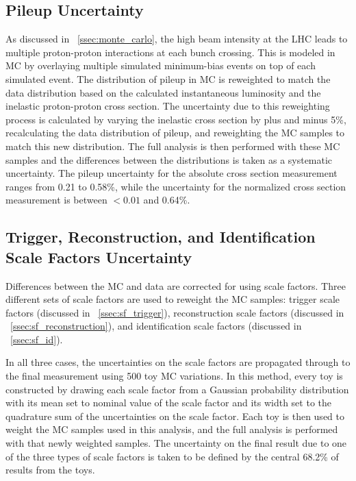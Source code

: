 \subsection{Pileup Uncertainty}
\label{ssec:pileup_uncertainty}

As discussed in \SEC~\ref{ssec:monte_carlo}, the high beam intensity at the LHC
leads to multiple proton-proton interactions at each bunch crossing. This is
modeled in MC by overlaying multiple simulated minimum-bias events on top of
each simulated event. The distribution of pileup in MC is reweighted to match
the data distribution based on the calculated instantaneous luminosity and the
inelastic proton-proton cross section. The uncertainty due to this reweighting
process is calculated by varying the inelastic cross section by plus and minus
5\%, recalculating the data distribution of pileup, and reweighting the MC
samples to match this new distribution. The full analysis is then performed
with these MC samples and the differences between the \phistar distributions is
taken as a systematic uncertainty. The pileup uncertainty for the absolute
cross section measurement ranges from 0.21 to 0.58\%, while the uncertainty for
the normalized cross section measurement is between $< 0.01$ and 0.64\%.

\subsection{Trigger, Reconstruction, and Identification Scale Factors Uncertainty}
\label{scale_factor_uncertainty}

Differences between the MC and data are corrected for using scale factors.
Three different sets of scale factors are used to reweight the MC samples:
trigger scale factors (discussed in \SEC~\ref{ssec:sf_trigger}), reconstruction
scale factors (discussed in \SEC~\ref{ssec:sf_reconstruction}), and
identification scale factors (discussed in \SEC~\ref{ssec:sf_id}).

In all three cases, the uncertainties on the scale factors are propagated
through to the final measurement using 500 toy MC variations. In this method,
every toy is constructed by drawing each scale factor from a Gaussian
probability distribution with its mean set to nominal value of the scale factor
and its width set to the quadrature sum of the uncertainties on the scale
factor. Each toy is then used to weight the MC samples used in this analysis,
and the full analysis is performed with that newly weighted samples. The
uncertainty on the final result due to one of the three types of scale factors
is taken to be defined by the central 68.2\% of results from the toys.


